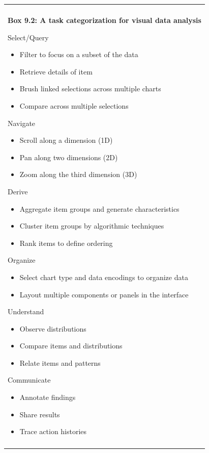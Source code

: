 \documentclass[]{krantz}
\newenvironment{F00}
    {\begin{center}
    \begin{tabular}{|p{0.9\textwidth}|}
    \hline\\
    }
    { 
    \\\\\hline
    \end{tabular} 
    \end{center}
    }
\begin{document}
\begin{F00}
\textbf{Box 9.2: A task categorization for visual data analysis}

Select/Query

\begin{itemize}
\item
  Filter to focus on a subset of the data
\item
  Retrieve details of item
\item
  Brush linked selections across multiple charts
\item
  Compare across multiple selections
\end{itemize}

Navigate

\begin{itemize}
\item
  Scroll along a dimension (1D)
\item
  Pan along two dimensions (2D)
\item
  Zoom along the third dimension (3D)
\end{itemize}

Derive

\begin{itemize}
\item
  Aggregate item groups and generate characteristics
\item
  Cluster item groups by algorithmic techniques
\item
  Rank items to define ordering
\end{itemize}

Organize

\begin{itemize}
\item
  Select chart type and data encodings to organize data
\item
  Layout multiple components or panels in the interface
\end{itemize}

Understand

\begin{itemize}
\item
  Observe distributions
\item
  Compare items and distributions
\item
  Relate items and patterns
\end{itemize}

Communicate

\begin{itemize}
\item
  Annotate findings
\item
  Share results
\item
  Trace action histories
\end{itemize}
\end{F00}
\end{document}
